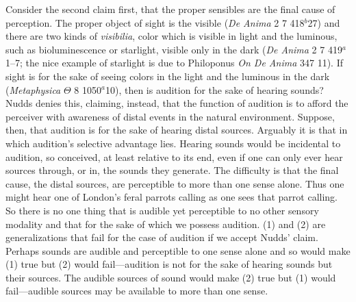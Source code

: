 Consider the second claim first, that the proper sensibles are the final cause of perception. The proper object of sight is the visible (\emph{De Anima} 2 7 418\( ^{b} \)27) and there are two kinds of \emph{visibilia}, color which is visible in light and the luminous, such as bioluminescence or starlight, visible only in the dark (\emph{De Anima} 2 7 419\( ^{a} \)1--7; the nice example of starlight is due to Philoponus  \emph{On \emph{De Anima}} 347 11). If sight is for the sake of seeing colors in the light and the luminous in the dark (\emph{Metaphysica} \( \Theta \) 8 1050\( ^{a} \)10), then is audition for the sake of hearing sounds? Nudds denies this, claiming, instead, that the function of audition is to afford the perceiver with awareness of distal events in the natural environment. Suppose, then, that audition is for the sake of hearing distal sources. Arguably it is that in which audition's selective advantage lies. Hearing sounds would be incidental to audition, so conceived, at least relative to its end, even if one can only ever hear sources through, or in, the sounds they generate. The difficulty is that the final cause, the distal sources, are perceptible to more than one sense alone. Thus one might hear one of London's feral parrots calling as one sees that parrot calling. So there is no one thing that is audible yet perceptible to no other sensory modality and that for the sake of which we possess audition. (1) and (2) are generalizations that fail for the case of audition if we accept Nudds' claim. Perhaps sounds are audible and perceptible to one sense alone and so would make (1) true but (2) would fail---audition is not for the sake of hearing sounds but their sources. The audible sources of sound would make (2) true but (1) would fail---audible sources may be available to more than one sense.

